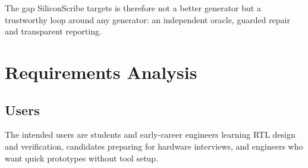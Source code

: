 \documentclass[11pt,a4paper]{article}
\begin{document}
The gap SiliconScribe targets is therefore not a better generator but a trustworthy loop around any generator: an independent oracle, guarded repair and transparent reporting.

\section{Requirements Analysis}
\label{sec:req}

\subsection{Users}
The intended users are students and early-career engineers learning RTL design and verification, candidates preparing for hardware interviews, and engineers who want quick prototypes without tool setup.
\end{document}
